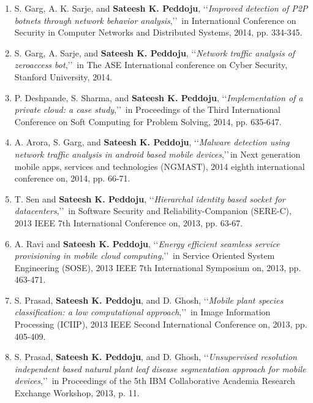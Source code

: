 \begin{enumerate}
	\item
	S. Garg, A. K. Sarje, and \textbf{Sateesh K. Peddoju}, \lq\lq \textit{Improved detection of P2P botnets through network behavior analysis},\rq\rq\, in International Conference on Security in Computer Networks and Distributed Systems, 2014, pp. 334-345.
	
	\item
	S. Garg, A. Sarje, and \textbf{Sateesh K. Peddoju}, \lq\lq \textit{Network traffic analysis of zeroaccess bot},\rq\rq\, in The ASE International conference on Cyber Security, Stanford University, 2014.
	
	\item
	P. Deshpande, S. Sharma, and \textbf{Sateesh K. Peddoju}, \lq\lq \textit{Implementation of a private cloud: a case study},\rq\rq\, in Proceedings of the Third International Conference on Soft Computing for Problem Solving, 2014, pp. 635-647.
	
	\item
	A. Arora, S. Garg, and \textbf{Sateesh K. Peddoju}, \lq\lq \textit{Malware detection using network traffic analysis in android based mobile devices},\rq\rq\,in Next generation mobile apps, services and technologies (NGMAST), 2014 eighth international conference on, 2014, pp. 66-71.
	
	\item
	T. Sen and \textbf{Sateesh K. Peddoju}, \lq\lq \textit{Hierarchal identity based socket for datacenters},\rq\rq\, in Software Security and Reliability-Companion (SERE-C), 2013 IEEE 7th International Conference on, 2013, pp. 63-67.
	
	\item
	A. Ravi and \textbf{Sateesh K. Peddoju}, \lq\lq \textit{Energy efficient seamless service provisioning in mobile cloud computing},\rq\rq\, in Service Oriented System Engineering (SOSE), 2013 IEEE 7th International Symposium on, 2013, pp. 463-471.
	
	\item
	S. Prasad, \textbf{Sateesh K. Peddoju}, and D. Ghosh, \lq\lq \textit{Mobile plant species classification: a low computational approach},\rq\rq\, in Image Information Processing (ICIIP), 2013 IEEE Second International Conference on, 2013, pp. 405-409.
	
	\item
	S. Prasad, \textbf{Sateesh K. Peddoju}, and D. Ghosh, \lq\lq \textit{Unsupervised resolution independent based natural plant leaf disease segmentation approach for mobile devices},\rq\rq\, in Proceedings of the 5th IBM Collaborative Academia Research Exchange Workshop, 2013, p. 11.
	

\end{enumerate}
